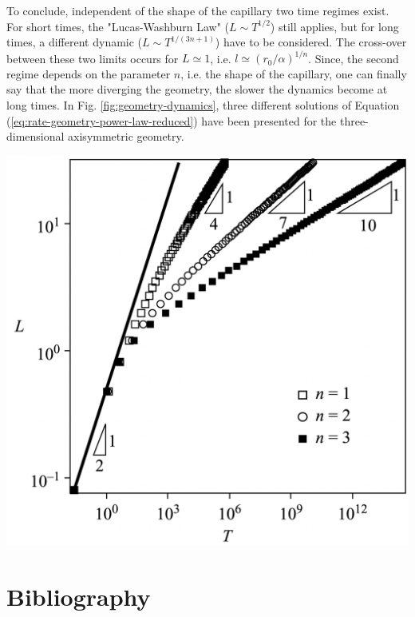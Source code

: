 \documentclass[aip, amsmath, amssymb, reprint, twocolumn, floatfix]{revtex4-1}
\begin{document}
To conclude, independent of the shape of the capillary two time regimes exist. For short times, the "Lucas-Washburn Law" ($L \sim T^{1/2}$) still applies, but for long times, a different dynamic ($L \sim T^{1/(3n+1)}$) have to be considered. The cross-over between these two limits occurs for $L \simeq 1$, i.e. $l \simeq (r_0/\alpha)^{1/n}$. Since, the second regime depends on the parameter $n$, i.e. the shape of the capillary, one can finally say that the more diverging the geometry, the slower the dynamics become at long times.  In Fig. \ref{fig:geometry-dynamics}, three different solutions of Equation (\ref{eq:rate-geometry-power-law-reduced}) have been presented for the three-dimensional axisymmetric geometry.
\begin{center}
	\captionsetup{type=figure}
	\includegraphics[width = \linewidth]{../pictures/Geometry-Dynamics.png}
	\label{fig:geometry-dynamics}
\end{center}


\section{Bibliography}
\end{document}
